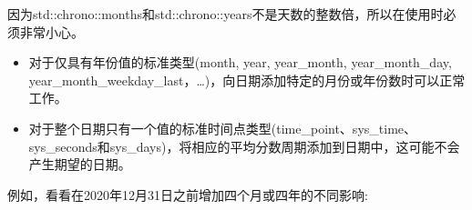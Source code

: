 

因为std::chrono::months和std::chrono::years不是天数的整数倍，所以在使用时必须非常小心。

\begin{itemize}
\item 
对于仅具有年份值的标准类型(month, year, year\_month, year\_month\_day, year\_month\_weekday\_last，…)，向日期添加特定的月份或年份数时可以正常工作。

\item
对于整个日期只有一个值的标准时间点类型(time\_point、sys\_time、sys\_seconds和sys\_days)，将相应的平均分数周期添加到日期中，这可能不会产生期望的日期。 
\end{itemize}

例如，看看在2020年12月31日之前增加四个月或四年的不同影响:

